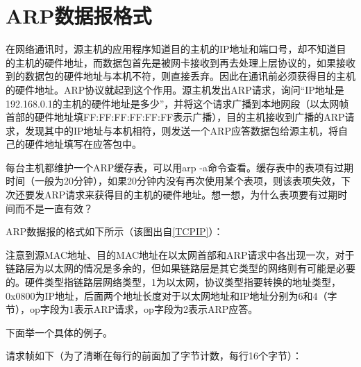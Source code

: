 


\section{ARP数据报格式}
%
在网络通讯时，源主机的应用程序知道目的主机的IP地址和端口号，却不知道目的主机的硬件地址，而数据包首先是被网卡接收到再去处理上层协议的，如果接收到的数据包的硬件地址与本机不符，则直接丢弃。因此在通讯前必须获得目的主机的硬件地址。ARP协议就起到这个作用。源主机发出ARP请求，询问“IP地址是192.\BookSplit{}168.\BookSplit{}0.\BookSplit{}1的主机的硬件地址是多少”，并将这个请求广播到本地网段（以太网帧首部的硬件地址填FF:\BookSplit{}FF:\BookSplit{}FF:\BookSplit{}FF:\BookSplit{}FF:\BookSplit{}FF表示广播），目的主机接收到广播的ARP请求，发现其中的IP地址与本机相符，则发送一个ARP应答数据包给源主机，将自己的硬件地址填写在应答包中。



每台主机都维护一个ARP缓存表，可以用arp -a命令查看。缓存表中的表项有过期时间（一般为20分钟），如果20分钟内没有再次使用某个表项，则该表项失效，下次还要发ARP请求来获得目的主机的硬件地址。想一想，为什么表项要有过期时间而不是一直有效？



ARP数据报的格式如下所示（该图出自\hyperlink{db.bi01.bibli.tcpip}{[TCPIP]}）：




注意到源MAC地址、目的MAC地址在以太网首部和ARP请求中各出现一次，对于链路层为以太网的情况是多余的，但如果链路层是其它类型的网络则有可能是必要的。硬件类型指链路层网络类型，1为以太网，协议类型指要转换的地址类型，0x0800为IP地址，后面两个地址长度对于以太网地址和IP地址分别为6和4（字节），op字段为1表示ARP请求，op字段为2表示ARP应答。



下面举一个具体的例子。



请求帧如下（为了清晰在每行的前面加了字节计数，每行16个字节）：


\begin{BookLiteral}
\end{BookLiteral}


